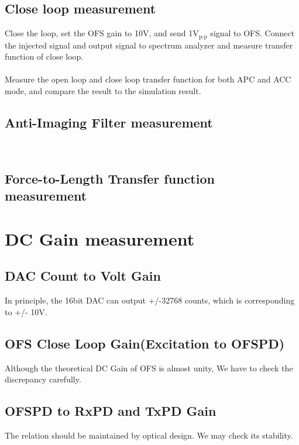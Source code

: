 \subsection{Close loop measurement}
\label{OFS_CLTF}
Close the loop, set the OFS gain to 10V, and send 1$\mbox{V}_{\mbox{p-p}}$ signal to OFS. Connect the injected signal and output signal to spectrum analyzer and measure transfer function of close loop.
\\\\
\noindent Measure the open loop and close loop transfer function for both APC and ACC mode, and compare the result to the simulation result.

\subsection{Anti-Imaging Filter measurement}
     \\
    
\subsection{Force-to-Length Transfer function measurement}
\section{DC Gain measurement}
\subsection{DAC Count to Volt Gain}
    In principle, the 16bit DAC can output +/-32768 counts, which is corresponding to +/- 10V. 
\subsection{OFS Close Loop Gain(Excitation to OFSPD)}
    Although the theoretical DC Gain of OFS is almost unity, We have to check the discrepancy carefully. 
\subsection{OFSPD to RxPD and TxPD Gain}
    The relation should be maintained by optical design. We may check its stability.
